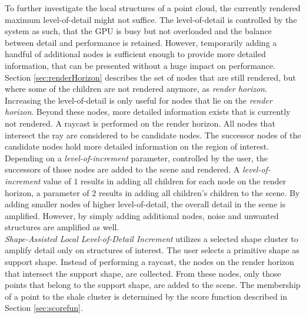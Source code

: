 To further investigate the local structures of a point cloud, the currently rendered maximum level-of-detail might not suffice. The level-of-detail is controlled by the system as such, that the GPU is busy but not overloaded and the balance between detail and performance is retained. However, temporarily adding a handful of additional nodes is sufficient enough to provide more detailed information, that can be presented without a huge impact on performance.
\\

Section \ref{sec:renderHorizon} describes the set of nodes that are still rendered, but where some of the children are not rendered anymore, as \textit{render horizon}. 
Increasing the level-of-detail is only useful for nodes that lie on the \textit{render horizon}. Beyond these nodes, more detailed information exists that is currently not rendered. A raycast is performed on the render horizon. All nodes that intersect the ray are considered to be candidate nodes. The successor nodes of the candidate nodes hold more detailed information on the region of interest. Depending on a \textit{level-of-increment} parameter, controlled by the user, the successors of those nodes are added to the scene and rendered. A \textit{level-of-increment} value of $1$ results in adding all children for each node on the render horizon, a parameter of $2$ results in adding all children's children to the scene. 
By adding smaller nodes of higher level-of-detail, the overall detail in the scene is amplified. However, by simply adding additional nodes, noise and unwanted structures are amplified as well. 
\\

\textit{Shape-Assisted Local Level-of-Detail Increment} utilizes a selected shape cluster to amplify detail only on structures of interest. The user selects a primitive shape as support shape. Instead of performing a raycast, the nodes on the render horizon that intersect the support shape, are collected. From these nodes, only those points that belong to the support shape, are added to the scene. The membership of a point to the shale cluster is determined by the score function described in Section \ref{sec:scorefun}. 

